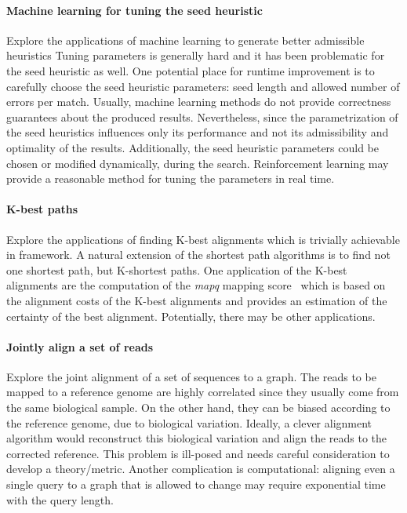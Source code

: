 \paragraph{Machine learning for tuning the seed heuristic}
Explore the applications of machine learning to generate better admissible
heuristics Tuning parameters is generally hard and it has been problematic for
the seed heuristic as well. One potential place for runtime improvement is to
carefully choose the seed heuristic parameters: seed length and allowed number
of errors per match. Usually, machine learning methods do not provide correctness
guarantees about the produced results. Nevertheless, since the parametrization
of the seed heuristics influences only its performance and not its admissibility
and optimality of the results. Additionally, the seed heuristic parameters could
be chosen or modified dynamically, during the \A search. Reinforcement learning
may provide a reasonable method for tuning the parameters in real time.

\paragraph{K-best paths}
Explore the applications of finding K-best alignments which is trivially
achievable in \A framework. A natural extension of the shortest path algorithms
is to find not one shortest path, but K-shortest paths. One application of the
K-best alignments are the computation of the \textit{mapq} mapping
score~\citep{li2008mapping} which is based on the alignment costs of the K-best
alignments and provides an estimation of the certainty of the best alignment.
Potentially, there may be other applications.

\paragraph{Jointly align a set of reads}
Explore the joint alignment of a set of sequences to a graph. The reads to be
mapped to a reference genome are highly correlated since they usually come from
the same biological sample. On the other hand, they can be biased according to
the reference genome, due to biological variation. Ideally, a clever alignment
algorithm would reconstruct this biological variation and align the reads to the
corrected reference. This problem is ill-posed and needs careful consideration
to develop a theory/metric. Another complication is computational: aligning even
a single query to a graph that is allowed to change may require exponential time
with the query length.

